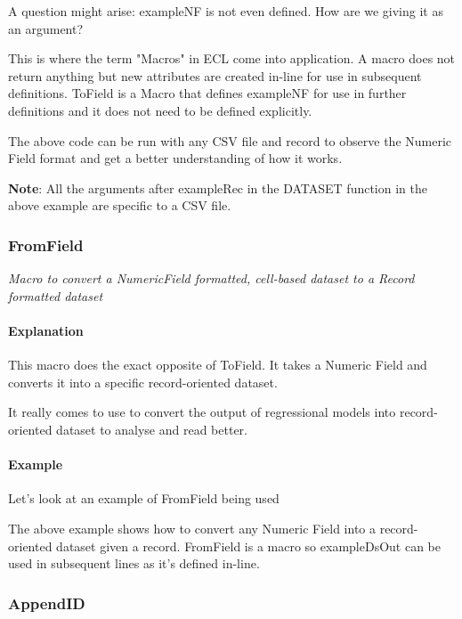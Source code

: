 A question might arise: exampleNF is not even defined. How are we giving it as an argument?

This is where the term "Macros" in ECL come into application. A macro does not return anything but new attributes are created in-line for use in subsequent definitions. ToField is a Macro that defines exampleNF for use in further definitions and it does not need to be defined explicitly.

The above code can be run with any CSV file and record to observe the Numeric Field format and get a better understanding of how it works.

\textbf{Note}: All the arguments after exampleRec in the DATASET function in the above example are specific to a CSV file.

\subsubsection{FromField}\label{mlcore:fromfield}

\textit{Macro to convert a NumericField formatted, cell-based dataset to a Record formatted dataset}

\paragraph{Explanation}

This macro does the exact opposite of ToField. It takes a Numeric Field and converts it into a specific record-oriented dataset. 

It really comes to use to convert the output of regressional models into record-oriented dataset to analyse and read better. 

\paragraph{Example}

Let's look at an example of FromField being used



The above example shows how to convert any Numeric Field into a record-oriented dataset given a record. FromField is a macro so exampleDsOut can be used in subsequent lines as it's defined in-line.

\subsubsection{AppendID}\label{mlcore:appendid}

